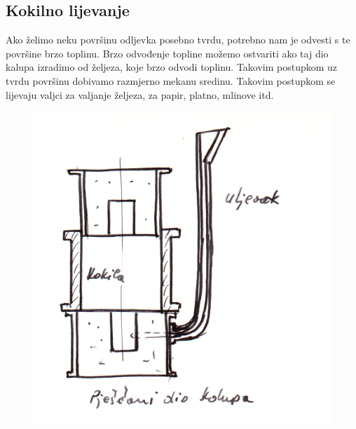 \documentclass[a4paper,12pt]{article}
\numberwithin{figure}{section}
\begin{document}
\subsection{Kokilno lijevanje}
Ako želimo neku površinu odljevka posebno tvrdu, potrebno nam je odvesti s te površine brzo toplinu. Brzo odvođenje topline možemo ostvariti ako taj dio kalupa izradimo od željeza, koje brzo odvodi toplinu. Takovim postupkom uz tvrdu površinu dobivamo razmjerno mekanu sredinu. Takovim postupkom se lijevaju valjci za valjanje željeza, za papir, platno, mlinove itd.
\begin{figure}[!h]
\centering
\includegraphics[scale=0.17]{image_60-1.png}
\end{figure}
\FloatBarrier
\end{document}
